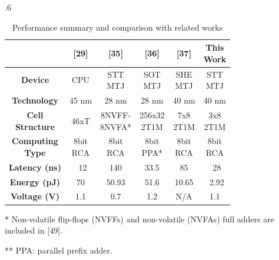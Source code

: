 \documentclass[submit]{elex2024}%
\begin{document}
\begin{table}[ht]
    \centering
    \begin{threeparttable}
    \tabcolsep.6\tabcolsep
    \caption{Performance summary and comparison with related works}
    \label{tab:5}
    \begin{tabular}{|c|c|c|c|c|c|}
    \hline
    \quad                   &\textbf{[29]} & \textbf{[35]} & \textbf{[36]} & \textbf{[37]} & \makecell[c]{\textbf{This} \\ \textbf{Work}} \\
    \hline
    \textbf{Device}         & CPU & \makecell[c]{STT \\ MTJ} & \makecell[c]{SOT \\ MTJ} & \makecell[c]{SHE \\ MTJ} & \makecell[c]{STT \\ MTJ} \\
    \hline
    \textbf{Technology}     & 45 nm & 28 nm & 28 nm & 40 nm & 40 nm \\ 
    \hline
    \makecell[c]{\textbf{Cell} \\ \textbf{Structure}} & 46xT & \makecell[c]{8NVFF- \\ 8NVFA* } & \makecell[c]{256x32 \\ 2T1M } & \makecell[c]{7x8 \\ 2T1M } & \makecell[c]{3x8 \\ 2T1M } \\ 
    \hline
    \makecell[c]{\textbf{Computing} \\ \textbf{Type}} & \makecell[c]{8bit \\ RCA } & \makecell[c]{8bit \\ RCA } & \makecell[c]{8bit \\ PPA* } & \makecell[c]{8bit \\ RCA } & \makecell[c]{8bit \\ RCA } \\ 
    \hline
    \textbf{Latency (ns)}   & ~12 & 140 & 33.5 & 85 & ~28 \\ 
    \hline
    \textbf{Energy (pJ)}    & 70 & 50.93 & 51.6 & 10.65 & ~2.92 \\ 
    \hline
    \textbf{Voltage (V)}    & 1.1 & 0.7 & 1.2 & N/A & 1.1 \\ 
    \hline
    \end{tabular}
    \begin{tablenotes}
        \item[*] Non-volatile flip-flops (NVFFs) and non-volatile (NVFAs) full adders are included in [49].
        \item[**]  PPA: parallel prefix adder.
    \end{tablenotes}
\end{threeparttable}
\end{table}
\end{document}

